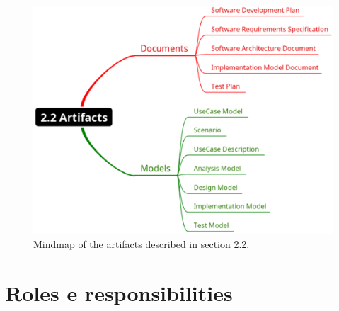 \documentclass[11pt, twoside, a4paper]{book}
\begin{document}
				\begin{figure}[!ht]
					\centering
  					\includegraphics[scale=0.4]{2-2_Artifacts.eps}
					\caption{Mindmap of the artifacts described in section 2.2.}
				\end{figure}    		


        	\section{Roles e responsibilities}
        	
\end{document}
